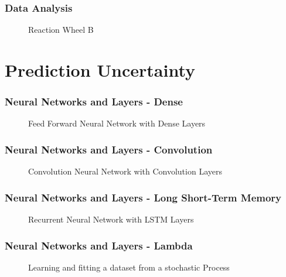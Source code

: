 \begin{frame}
	\frametitle{Data Analysis}
	
\begin{figure}
\centering

\caption{Reaction Wheel B}
\end{figure}

\end{frame}

%	
%
%

\section{Prediction Uncertainty}

\begin{frame}
	\frametitle{Neural Networks and Layers - Dense}
	
\begin{figure}
\centering
\scalebox{0.75}{}
\caption{Feed Forward Neural Network with Dense Layers}
\end{figure}

\end{frame}

\begin{frame}
	\frametitle{Neural Networks and Layers - Convolution}
	
\begin{figure}
\centering
\scalebox{0.75}{}
\caption{Convolution Neural Network with Convolution Layers}
\end{figure}

\end{frame}

\begin{frame}
	\frametitle{Neural Networks and Layers - Long Short-Term Memory}
	
\begin{figure}
\centering
\scalebox{0.75}{}
\caption{Recurrent Neural Network with LSTM Layers}
\end{figure}

\end{frame}

\begin{frame}
	\frametitle{Neural Networks and Layers - Lambda}
	
\begin{figure}
\centering
{}
\caption{Learning and fitting a dataset from a stochastic Process}
\end{figure}

\end{frame}

